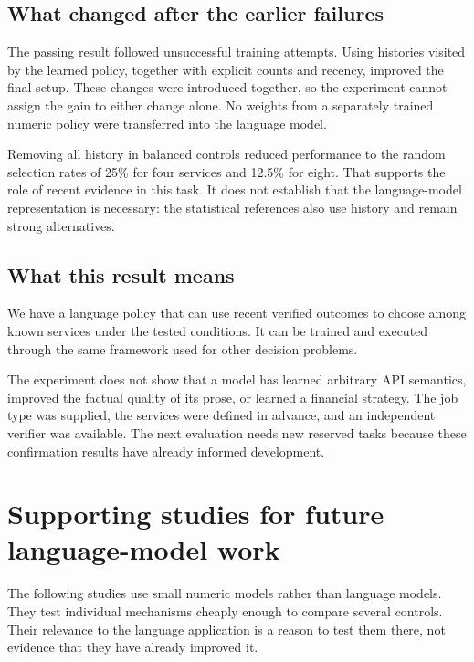 \documentclass{strategynet-journal}
\begin{document}
\begin{SNcolumns}
\subsection{What changed after the earlier failures}

The passing result followed unsuccessful training attempts. Using histories
visited by the learned policy, together with explicit counts and recency,
improved the final setup. These changes were introduced together, so the
experiment cannot assign the gain to either change alone. No weights from
a separately trained numeric policy were transferred into the language model.

Removing all history in balanced controls reduced performance to the random
selection rates of 25\% for four services and 12.5\% for eight. That supports
the role of recent evidence in this task. It does not establish that the
language-model representation is necessary: the statistical references also
use history and remain strong alternatives.

\subsection{What this result means}

We have a language policy that can use recent verified outcomes to choose
among known services under the tested conditions. It can be trained and
executed through the same framework used for other decision problems.

The experiment does not show that a model has learned arbitrary API semantics,
improved the factual quality of its prose, or learned a financial strategy.
The job type was supplied, the services were defined in advance, and an
independent verifier was available. The next evaluation needs new reserved
tasks because these confirmation results have already informed development.

\section{Supporting studies for future language-model work}

The following studies use small numeric models rather than language models.
They test individual mechanisms cheaply enough to compare several controls.
Their relevance to the language application is a reason to test them there,
not evidence that they have already improved it.


\end{SNcolumns}
\end{document}
